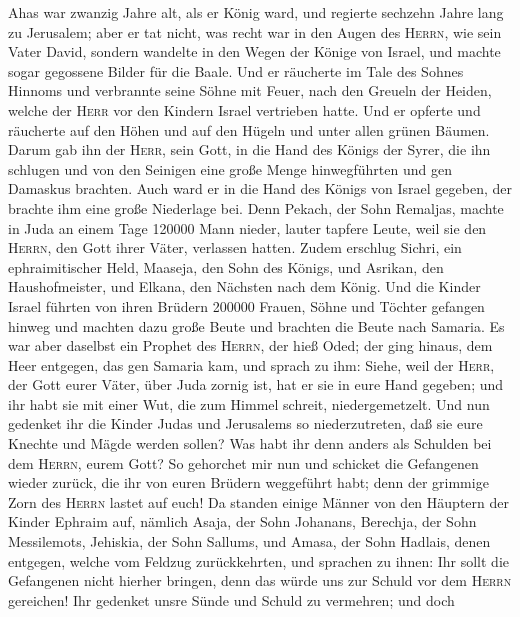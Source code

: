  Ahas war zwanzig Jahre alt, als er König ward, und
regierte sechzehn Jahre lang zu Jerusalem; aber er tat nicht, was recht
war in den Augen des \textsc{Herrn}, wie sein Vater David,
 sondern wandelte in den Wegen der Könige von Israel, und
machte sogar gegossene Bilder für die Baale.  Und er
räucherte im Tale des Sohnes Hinnoms und verbrannte seine Söhne mit
Feuer, nach den Greueln der Heiden, welche der \textsc{Herr} vor den
Kindern Israel vertrieben hatte.  Und er opferte und
räucherte auf den Höhen und auf den Hügeln und unter allen grünen
Bäumen.  Darum gab ihn der \textsc{Herr}, sein Gott, in
die Hand des Königs der Syrer, die ihn schlugen und von den Seinigen
eine große Menge hinwegführten und gen Damaskus brachten. Auch ward er
in die Hand des Königs von Israel gegeben, der brachte ihm eine große
Niederlage bei.  Denn Pekach, der Sohn Remaljas, machte in
Juda an einem Tage 120000 Mann nieder, lauter tapfere Leute, weil sie
den \textsc{Herrn}, den Gott ihrer Väter, verlassen hatten.
 Zudem erschlug Sichri, ein ephraimitischer Held, Maaseja,
den Sohn des Königs, und Asrikan, den Haushofmeister, und Elkana, den
Nächsten nach dem König.  Und die Kinder Israel führten
von ihren Brüdern 200000 Frauen, Söhne und Töchter gefangen hinweg und
machten dazu große Beute und brachten die Beute nach Samaria.
 Es war aber daselbst ein Prophet des \textsc{Herrn}, der
hieß Oded; der ging hinaus, dem Heer entgegen, das gen Samaria kam, und
sprach zu ihm: Siehe, weil der \textsc{Herr}, der Gott eurer Väter, über
Juda zornig ist, hat er sie in eure Hand gegeben; und ihr habt sie mit
einer Wut, die zum Himmel schreit, niedergemetzelt.  Und
nun gedenket ihr die Kinder Judas und Jerusalems so niederzutreten, daß
sie eure Knechte und Mägde werden sollen? Was habt ihr denn anders als
Schulden bei dem \textsc{Herrn}, eurem Gott?  So
gehorchet mir nun und schicket die Gefangenen wieder zurück, die ihr von
euren Brüdern weggeführt habt; denn der grimmige Zorn des \textsc{Herrn}
lastet auf euch!  Da standen einige Männer von den
Häuptern der Kinder Ephraim auf, nämlich Asaja, der Sohn Johanans,
Berechja, der Sohn Messilemots, Jehiskia, der Sohn Sallums, und Amasa,
der Sohn Hadlais, denen entgegen, welche vom Feldzug zurückkehrten,
 und sprachen zu ihnen: Ihr sollt die Gefangenen nicht
hierher bringen, denn das würde uns zur Schuld vor dem \textsc{Herrn}
gereichen! Ihr gedenket unsre Sünde und Schuld zu vermehren; und doch
